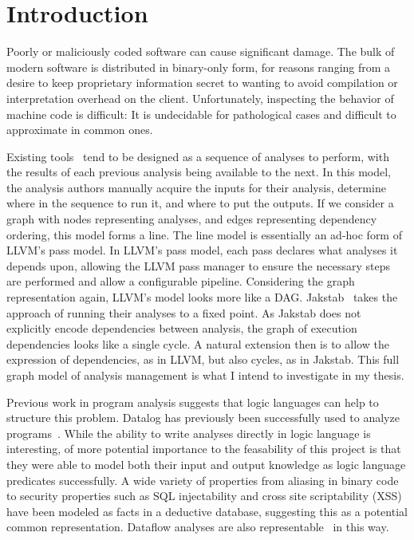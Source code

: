 \chapter{Introduction}
Poorly or maliciously coded software can cause significant damage.
The bulk of modern software is distributed in binary-only form, for reasons ranging from a desire to keep proprietary information secret to wanting to avoid compilation or interpretation overhead on the client.
Unfortunately, inspecting the behavior of machine code is difficult:
It is undecidable for pathological cases and difficult to approximate in common ones.

Existing tools~\cite{ida, bap, bitblaze, bindead} tend to be designed as a sequence of analyses to perform, with the results of each previous analysis being available to the next.
In this model, the analysis authors manually acquire the inputs for their analysis, determine where in the sequence to run it, and where to put the outputs.
If we consider a graph with nodes representing analyses, and edges representing dependency ordering, this model forms a line.
The line model is essentially an ad-hoc form of LLVM\cite{llvm}'s pass model.
In LLVM's pass model, each pass declares what analyses it depends upon, allowing the LLVM pass manager to ensure the necessary steps are performed and allow a configurable pipeline.
Considering the graph representation again, LLVM's model looks more like a DAG.
Jakstab~\cite{jakstab} takes the approach of running their analyses to a fixed point.
As Jakstab does not explicitly encode dependencies between analysis, the graph of execution dependencies looks like a single cycle.
A natural extension then is to allow the expression of dependencies, as in LLVM, but also cycles, as in Jakstab.
This full graph model of analysis management is what I intend to investigate in my thesis.

Previous work in program analysis suggests that logic languages can help to structure this problem.
Datalog has previously been successfully used to analyze programs~\cite{lam2005,brumley2006,alpuente2011,doop1,bddbddb}.
While the ability to write analyses directly in logic language is interesting, of more potential importance to the feasability of this project is that they were able to model both their input and output knowledge as logic language predicates successfully.
A wide variety of properties from aliasing in binary code~\cite{brumley2006} to security properties such as SQL injectability and cross site scriptability (XSS)~\cite{lam2005} have been modeled as facts in a deductive database, suggesting this as a potential common representation.
Dataflow analyses are also representable~\cite{mcallester2002} in this way.

